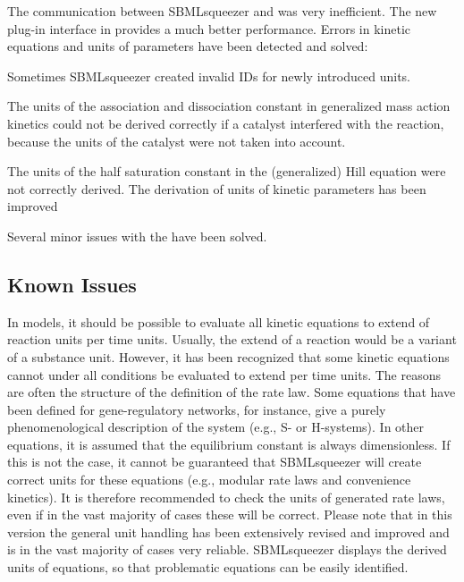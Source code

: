 The communication between SBMLsqueezer and \CellDesigner was very inefficient.
The new plug-in interface in \JSBML provides a much better performance.
Errors in kinetic equations and units of parameters have been detected and
solved:
\begin{dinglist}{54}
\item Sometimes SBMLsqueezer created invalid \acp{ID} for newly introduced
      units.
\item The units of the association and dissociation constant in generalized mass
      action kinetics could not be derived correctly if a catalyst interfered
      with the reaction, because the units of the catalyst were not taken into
      account.
\item The units of the half saturation constant in the (generalized) Hill
      equation were not correctly derived. The derivation of units of kinetic
      parameters has been improved
\end{dinglist}  
Several minor issues with the \GUI have been solved.

\subsection{Known Issues}

In \SBML models, it should be possible to evaluate all kinetic equations to
extend of reaction units per time units. Usually, the extend of a reaction would
be a variant of a substance unit. However, it has been recognized that some
kinetic equations cannot under all conditions be evaluated to extend per time
units. The reasons are often the structure of the definition of the rate law.
Some equations that have been defined for gene-regulatory networks, for
instance, give a purely phenomenological description of the system (e.g.,
S- or H-systems). In other equations, it is assumed that the equilibrium constant
is always dimensionless. If this is not the case, it cannot be guaranteed that
SBMLsqueezer will create correct units for these equations (e.g., modular rate
laws and convenience kinetics). It is therefore recommended to check the units
of generated rate laws, even if in the vast majority of cases these will be
correct. Please note that in this version the general unit handling has been
extensively revised and improved and is in the vast majority of cases very
reliable. SBMLsqueezer displays the derived units of equations, so that
problematic equations can be easily identified.
